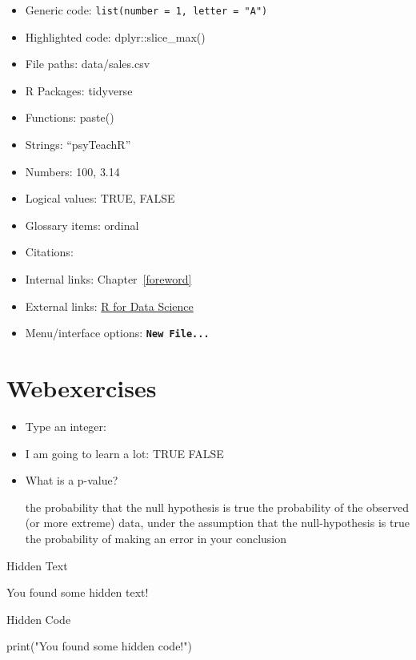 \documentclass[
  oneside]{book}
\newenvironment{Shaded}{\begin{snugshade}}{\end{snugshade}}
\newcommand{\FunctionTok}[1]{\textcolor[rgb]{0.00,0.00,0.00}{#1}}
\newcommand{\NormalTok}[1]{#1}
\newcommand{\StringTok}[1]{\textcolor[rgb]{0.31,0.60,0.02}{#1}}
\providecommand{\tightlist}{%
  \setlength{\itemsep}{0pt}\setlength{\parskip}{0pt}}
\begin{document}
\begin{itemize}
\tightlist
\item
  Generic code: \texttt{list(number\ =\ 1,\ letter\ =\ "A")}
\item
  Highlighted code: {dplyr}{::}{slice\_max}{(}{)}
\item
  File paths: data/sales.csv
\item
  R Packages: tidyverse
\item
  Functions: {paste}{(}{)}
\item
  Strings: {``psyTeachR''}
\item
  Numbers: {100}, {3.14}
\item
  Logical values: {TRUE}, {FALSE}
\item
  Glossary items: ordinal
\item
  Citations: \citet{R-tidyverse}
\item
  Internal links: Chapter~\ref{foreword}
\item
  External links: \href{https://r4ds.had.co.nz/}{R for Data Science}
\item
  Menu/interface options: \textbf{\texttt{New\ File...}}
\end{itemize}

\hypertarget{webexercises}{%
\section{Webexercises}\label{webexercises}}

\begin{itemize}
\tightlist
\item
  Type an integer:
\item
  I am going to learn a lot: TRUE FALSE
\item
  What is a p-value?

  \hypertarget{radio_WPOWPLZBTY}{}
  {the probability that the null hypothesis is true} {the probability of the observed (or more extreme) data, under the assumption that the null-hypothesis is true} {the probability of making an error in your conclusion}
\end{itemize}

Hidden Text

You found some hidden text!

Hidden Code

\begin{Shaded}
\begin{Highlighting}[]
\FunctionTok{print}\NormalTok{(}\StringTok{"You found some hidden code!"}\NormalTok{)}
\end{Highlighting}
\end{Shaded}
\end{document}
